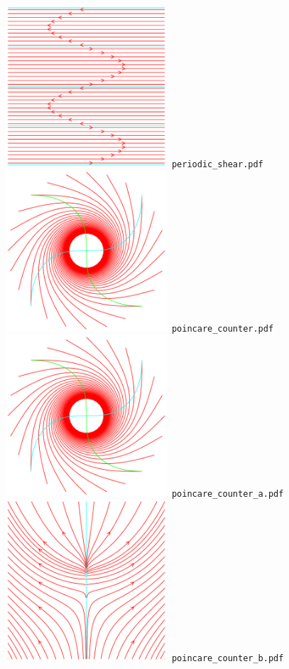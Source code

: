 \documentclass[a4paper]{amsart}
\begin{document}
\includegraphics[width=6cm]{periodic_shear.pdf}\verb+ periodic_shear.pdf+\\
\includegraphics[width=6cm]{poincare_counter.pdf}\verb+ poincare_counter.pdf+\\
\includegraphics[width=6cm]{poincare_counter_a.pdf}\verb+ poincare_counter_a.pdf+\\
\includegraphics[width=6cm]{poincare_counter_b.pdf}\verb+ poincare_counter_b.pdf+\\
\end{document}
